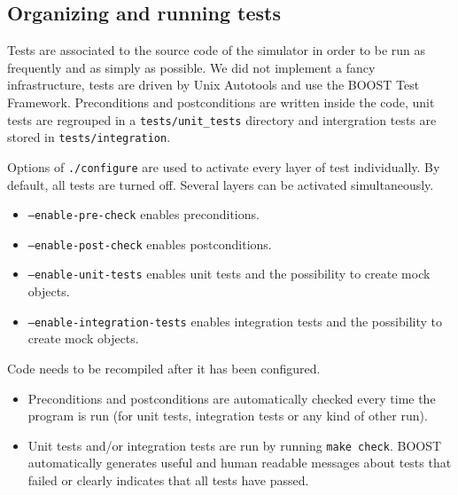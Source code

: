 \subsection{Organizing and running tests}

Tests are associated to the source code of the simulator in order to be run as frequently and as simply as possible. We did not implement a fancy infrastructure, tests are driven by Unix Autotools and use the BOOST Test Framework. Preconditions and postconditions are written inside the code, unit tests are regrouped in a \texttt{tests/unit\_tests} directory and intergration tests are stored in \texttt{tests/integration}.

Options of \texttt{./configure} are used to activate every layer of test individually. By default, all tests are turned off. Several layers can be activated simultaneously.
\begin{itemize}
  \item \texttt{--enable-pre-check} enables preconditions.
  \item \texttt{--enable-post-check} enables postconditions.
  \item \texttt{--enable-unit-tests} enables unit tests and the possibility to create mock objects.
  \item \texttt{--enable-integration-tests} enables integration tests and the possibility to create mock objects.
\end{itemize}

Code needs to be recompiled after it has been configured.
\begin{itemize}
  \item Preconditions and postconditions are automatically checked every time the program is run (for unit tests, integration tests or any kind of other run).
  \item Unit tests and/or integration tests are run by running \texttt{make check}. BOOST automatically generates useful and human readable messages about tests that failed or clearly indicates that all tests have passed.
\end{itemize}
